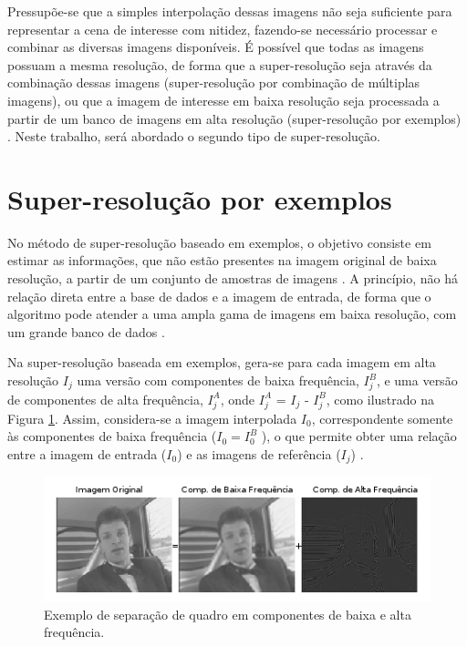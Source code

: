     Pressupõe-se que a simples interpolação dessas imagens não seja suficiente para representar a cena de interesse com nitidez, fazendo-se necessário processar e combinar as diversas imagens disponíveis. É possível que todas as imagens possuam a mesma resolução, de forma que a super-resolução seja através da combinação dessas imagens (super-resolução por combinação de múltiplas imagens), ou que a imagem de interesse em baixa resolução seja processada a partir de um banco de imagens em alta resolução (super-resolução por exemplos) \cite{garcia2013tecnicas}. Neste trabalho, será abordado o segundo tipo de super-resolução.


\section{Super-resolução por exemplos}
\label{SR_exemp}
No método de super-resolução baseado em exemplos, o objetivo consiste em estimar as informações, que não estão presentes na imagem original de baixa resolução, a partir de um conjunto de amostras de imagens \cite{rezio2013superresoluccao}. A princípio, não há relação direta entre a base de dados e a imagem de entrada, de forma que o algoritmo pode atender a uma ampla gama de imagens em baixa resolução, com um grande banco de dados \cite{freeman2002example}.


Na super-resolução baseada em exemplos, gera-se para cada imagem em alta resolução $I_j$ uma versão com componentes de baixa frequência, $I_j^B$, e uma versão de componentes de alta frequência, $I_j^A$, onde $I_j^A$ = $I_j$ - $I_j^B$, como ilustrado na Figura \ref{fig:exemplo_comp}. Assim, considera-se a imagem interpolada $I_0$, correspondente somente às componentes de baixa frequência ($I_0 = I_0^B$ ), o que permite obter uma relação entre a imagem de entrada ($I_0$) e as imagens de referência ($I_j$) \cite{garcia2013tecnicas}.


\begin{figure}[h]
	\centering
	\includegraphics[scale=1]{figuras/exemplo_equacao.png}
	\caption{Exemplo de separação de quadro em componentes de baixa e alta frequência.}
	\label{fig:exemplo_comp}
\end{figure}


